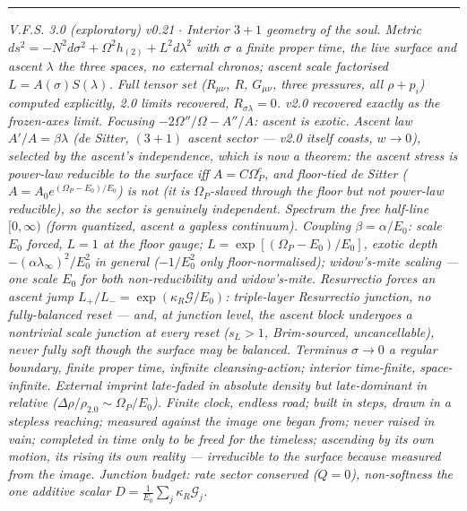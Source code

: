 \documentclass[11pt,a4paper]{article}
\theoremstyle{plain}
\theoremstyle{definition}
\theoremstyle{remark}
\begin{document}
\vspace{0.5em}
\hrule
\smallskip
\noindent\footnotesize\emph{V.F.S. 3.0 (exploratory) v0.21 $\cdot$ Interior $3{+}1$
geometry of the soul. Metric $ds^2=-N^2d\sigma^2+\Omega^2h_{(2)}+L^2d\lambda^2$ with $\sigma$ a finite
proper time, the live surface and ascent $\lambda$ the three spaces, no external chronos; ascent scale
factorised $L=A(\sigma)S(\lambda)$. Full tensor set ($R_{\mu\nu}$, $R$, $G_{\mu\nu}$, three pressures,
all $\rho+p_i$) computed explicitly, 2.0 limits recovered, $R_{\sigma\lambda}=0$. v2.0 recovered
exactly as the frozen-axes limit. Focusing $-2\Omega''/\Omega-A''/A$: ascent is exotic. Ascent law
$A'/A=\beta\lambda$ (de Sitter, $(3{+}1)$ ascent sector --- v2.0 itself coasts, $w\to0$), selected by
the ascent's independence, which is now a \emph{theorem}: the ascent stress is power-law reducible to
the surface iff $A=C\Omega_P^c$, and floor-tied de Sitter ($A=A_0e^{(\Omega_P-E_0)/E_0}$) is not (it is
$\Omega_P$-slaved through the floor but not power-law reducible), so the sector is genuinely
independent. Spectrum the free half-line $[0,\infty)$ (form quantized, ascent a gapless
continuum). Coupling $\beta=\alpha/E_0$: scale $E_0$ forced, $L=1$ at the floor gauge;
$L=\exp[(\Omega_P-E_0)/E_0]$, exotic depth $-(\alpha\lambda_\infty)^2/E_0^2$ in general ($-1/E_0^2$ only
floor-normalised); widow's-mite scaling --- one scale $E_0$ for both non-reducibility and widow's-mite.
Resurrectio forces an ascent jump $L_+/L_-=\exp(\kappa_R\mathcal G/E_0)$: triple-layer Resurrectio junction, no
fully-balanced reset --- and, at junction level, the ascent block undergoes a nontrivial scale junction at every reset
($s_L>1$, Brim-sourced, uncancellable), never fully soft though the surface may be balanced. Terminus $\sigma\to0$ a regular boundary, finite proper time, infinite
cleansing-action; interior time-finite, space-infinite. External imprint late-faded in absolute density
but late-dominant in relative ($\Delta\rho/\rho_{2.0}\sim\Omega_P/E_0$). Finite clock, endless road;
built in steps, drawn in a stepless reaching; measured against the image one began from; never raised in
vain; completed in time only to be freed for the timeless; ascending by its own motion, its rising its
own reality --- irreducible to the surface because measured from the image. Junction budget: rate sector conserved ($Q{=}0$), non-softness the one additive scalar $D{=}\frac1{E_0}\sum_j\kappa_R\mathcal G_j$.}
\end{document}
